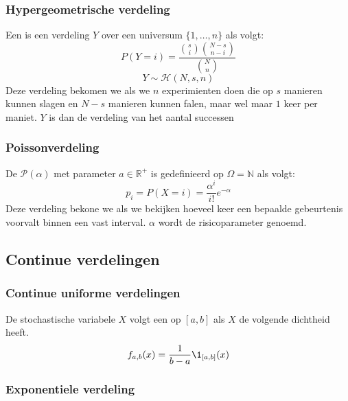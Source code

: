 \documentclass[main.tex]{subfiles}
\begin{document}
\subsubsection{Hypergeometrische verdeling}
\label{sec:hyperg-verd}

\begin{de}
  Een  is een verdeling $Y$ over een universum $\{1,\dotsc,n\}$ als volgt:
  \[ P(Y = i) = \frac{\binom{s}{i}\binom{N-s}{n-i}}{\binom{N}{n}}\]
  \[ Y \sim \mathcal{H}(N,s,n) \]
  Deze verdeling bekomen we als we $n$ experimienten doen die op $s$ manieren kunnen slagen en $N-s$ manieren kunnen falen, maar wel maar $1$ keer per maniet.
  $Y$ is dan de verdeling van het aantal successen
\end{de}

\subsubsection{Poissonverdeling}
\label{sec:poissonverdeling}

\begin{de}
  De  $\mathcal{P}(\alpha)$ met parameter $a\in \mathbb{R}^{+}$ is gedefinieerd op $\Omega = \mathbb{N}$ als volgt:
  \[ p_{i} = P(X=i) = \frac{\alpha^{i}}{i!}e^{-\alpha} \]
  Deze verdeling bekone we als we bekijken hoeveel keer een bepaalde gebeurtenis voorvalt binnen een vast interval.
  $\alpha$ wordt de risicoparameter genoemd.
\end{de}

\subsection{Continue verdelingen}
\label{sec:continue-verdelingen}

\subsubsection{Continue uniforme verdelingen}
\label{sec:cont-unif-verd}

\begin{de}
  De stochastische variabele $X$ volgt een  op $[a,b]$ als $X$ de volgende dichtheid heeft.
  \[ f_{a,b}(x) = \frac{1}{b-a}\1_{[a,b]}(x) \]
\end{de}

\subsubsection{Exponentiele verdeling}
\label{sec:expon-verd}
\end{document}
